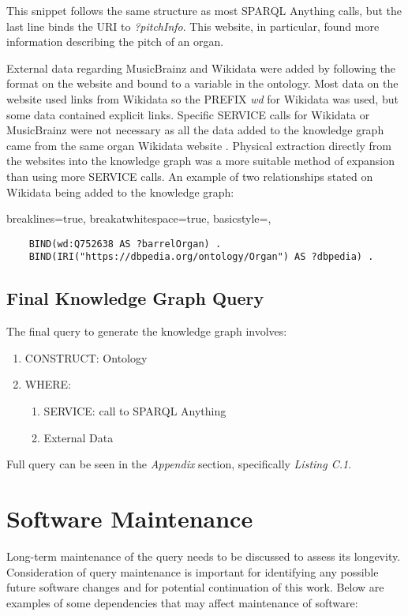 This snippet follows the same structure as most SPARQL Anything calls, but the last line binds the URI to \textit{?pitchInfo}. This website, in particular, found more information describing the pitch of an organ. 

External data regarding MusicBrainz and Wikidata were added by following the format on the website and bound to a variable in the ontology. Most data on the website used links from Wikidata so the PREFIX \textit{wd} for Wikidata was used, but some data contained explicit links. Specific SERVICE calls for Wikidata or MusicBrainz were not necessary as all the data added to the knowledge graph came from the same organ Wikidata website \cite{organwikidata}. Physical extraction directly from the websites into the knowledge graph was a more suitable method of expansion than using more SERVICE calls. An example of two relationships stated on Wikidata being added to the knowledge graph:

\lstset
{
    breaklines=true,
    breakatwhitespace=true,
    basicstyle=\ttfamily,
}
\begin{lstlisting}
    BIND(wd:Q752638 AS ?barrelOrgan) . 
    BIND(IRI("https://dbpedia.org/ontology/Organ") AS ?dbpedia) .
\end{lstlisting}

\subsection{Final Knowledge Graph Query}
\hspace*{0.5cm} The final query to generate the knowledge graph involves: 

\begin{enumerate}
    \item CONSTRUCT: Ontology
    \item WHERE:
    \begin{enumerate}
        \vspace{-0.25cm}
        \item SERVICE: call to SPARQL Anything
        \item External Data
    \end{enumerate}
\end{enumerate}

Full query can be seen in the \textit{Appendix} section, specifically \textit{Listing C.1}. 

\section{Software Maintenance}
\hspace{0.5cm} Long-term maintenance of the query needs to be discussed to assess its longevity. Consideration of query maintenance is important for identifying any possible future software changes and for potential continuation of this work. Below are examples of some dependencies that may affect maintenance of software:  

